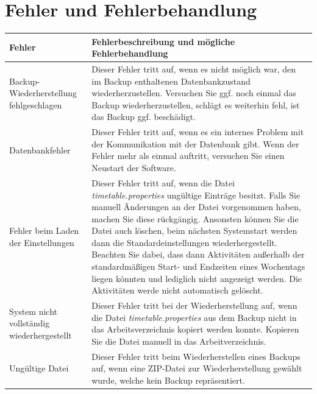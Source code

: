 \documentclass[fontsize=12pt]{scrartcl}
\begin{document}
\section{Fehler und Fehlerbehandlung}
\renewcommand{\arraystretch}{1.5}
\begin{tabularx}{\textwidth}{|p{5cm}|X|}
\hline
\textbf{Fehler} & \textbf{Fehlerbeschreibung und mögliche Fehlerbehandlung}\\\hline
Backup-Wiederherstellung fehlgeschlagen & Dieser Fehler tritt auf, wenn es nicht möglich war, den im Backup enthaltenen Datenbankzustand wiederherzustellen. Versuchen Sie ggf. noch einmal das Backup wiederherzustellen, schlägt es weiterhin fehl, ist das Backup ggf. beschädigt.\\\hline
Datenbankfehler & Dieser Fehler tritt auf, wenn es ein internes Problem mit der Kommunikation mit der Datenbank gibt. Wenn der Fehler mehr als einmal auftritt, versuchen Sie einen Neustart der Software.\\\hline
Fehler beim Laden der Einstellungen & Dieser Fehler tritt auf, wenn die Datei \textit{timetable.properties} ungültige Einträge besitzt. Falls Sie manuell Änderungen an der Datei vorgenommen haben, machen Sie diese rückgängig. Ansonsten können Sie die Datei auch löschen, beim nächsten Systemstart werden dann die Standardeinstellungen wiederhergestellt. Beachten Sie dabei, dass dann Aktivitäten außerhalb der standardmäßigen Start- und Endzeiten eines Wochentags liegen könnten und lediglich nicht angezeigt werden. Die Aktivitäten werde nicht automatisch gelöscht.\\\hline
System nicht vollständig wiederhergestellt & Dieser Fehler tritt bei der Wiederherstellung auf, wenn die Datei \textit{timetable.properties} aus dem Backup nicht in das Arbeitsverzeichnis kopiert werden konnte. Kopieren Sie die Datei manuell in das Arbeitverzeichnis.\\\hline
Ungültige Datei & Dieser Fehler tritt beim Wiederherstellen eines Backups auf, wenn eine ZIP-Datei zur Wiederherstellung gewählt wurde, welche kein Backup repräsentiert.\\\hline
\end{tabularx}
\end{document}

